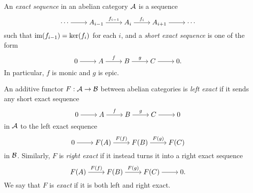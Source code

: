 \begin{definition}
  An \emph{exact sequence} in an abelian category $\abcat{A}$ is a sequence
  \[
    \begin{tikzcd}[cramped]
      \cdots & {A_{i - 1}} & {A_{i}} & {A_{i + 1}} & \cdots
      \arrow[from=1-1, to=1-2]
      \arrow["{f_{i - 1}}", from=1-2, to=1-3]
      \arrow["{f_i}", from=1-3, to=1-4]
      \arrow[from=1-4, to=1-5]
    \end{tikzcd}
  \]
  such that $\operatorname{im}(f_{i - 1}) = \ker(f_i)$ for each $i$, and a
  \emph{short exact sequence} is one of the form
  \[
    \begin{tikzcd}[cramped]
      0 & A & B & C & 0.
      \arrow[from=1-1, to=1-2]
      \arrow["f", from=1-2, to=1-3]
      \arrow["g", from=1-3, to=1-4]
      \arrow[from=1-4, to=1-5]
    \end{tikzcd}
  \]
  In particular, $f$ is monic and $g$ is epic.
  \iffalse
  We say a short exact sequence \emph{splits} (or is \emph{split}) if
  there is a commutative diagram
  \[
    \begin{tikzcd}[cramped]
      0 & A & B & C & 0 \\
      0 & A & {A \oplus C} & C & 0
      \arrow[from=1-1, to=1-2]
      \arrow["f", from=1-2, to=1-3]
      \arrow["\id"', from=1-2, to=2-2]
      \arrow["g", from=1-3, to=1-4]
      \arrow["\cong"', from=1-3, to=2-3]
      \arrow[from=1-4, to=1-5]
      \arrow["\id"', from=1-4, to=2-4]
      \arrow[from=2-1, to=2-2]
      \arrow[hook, from=2-2, to=2-3]
      \arrow[two heads, from=2-3, to=2-4]
      \arrow[from=2-4, to=2-5]
    \end{tikzcd}
  \]
  in $\abcat{A}$ with exact rows.
  \fi
\end{definition}

\begin{definition}
  \label{def_exact_functors}
  An additive functor $F: \mathcal{A} \to \mathcal{B}$ between abelian
  categories is \emph{left exact} if it sends any short exact sequence
  \[
    \begin{tikzcd}[cramped]
      0 & A & B & C & 0
      \arrow[from=1-1, to=1-2]
      \arrow["f", from=1-2, to=1-3]
      \arrow["g", from=1-3, to=1-4]
      \arrow[from=1-4, to=1-5]
    \end{tikzcd}
  \]
  in $\abcat{A}$ to the left exact sequence
  \[
    \begin{tikzcd}[cramped]
      0 & F(A) & F(B) & F(C)
      \arrow[from=1-1, to=1-2]
      \arrow["F(f)", from=1-2, to=1-3]
      \arrow["F(g)", from=1-3, to=1-4]
    \end{tikzcd}
  \]
  in $\mathcal{B}$.
  Similarly, $F$ is \emph{right exact} if it instead turns it into a
  right exact sequence
  \[
    \begin{tikzcd}[cramped]
      F(A) & F(B) & F(C) & 0.
      \arrow["F(f)", from=1-1, to=1-2]
      \arrow["F(g)", from=1-2, to=1-3]
      \arrow[from=1-3, to=1-4]
    \end{tikzcd}
  \]
  We say that $F$ is \emph{exact} if it is both left and right exact.
\end{definition}

